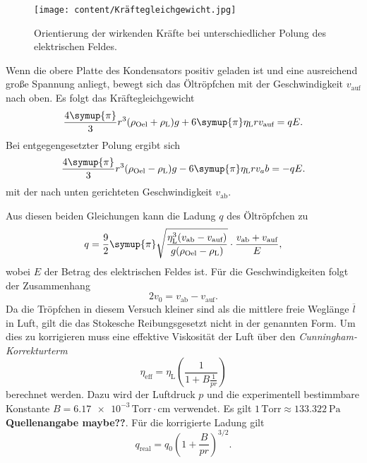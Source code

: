 \begin{figure}
    \centering
    \texttt{[image: content/Kräftegleichgewicht.jpg]}
    \label{fig:Kraeftegleichgewicht}
    \caption{Orientierung der wirkenden Kräfte bei unterschiedlicher Polung des elektrischen Feldes. \cite{v503}}
\end{figure}

Wenn die obere Platte des Kondensators positiv geladen ist und eine ausreichend große Spannung anliegt, bewegt sich das Öltröpfchen mit der Geschwindigkeit $v_\text{auf}$
nach oben. 
Es folgt das Kräftegleichgewicht
\begin{equation*}
    \label{eqn:Kraefte_v_auf}
    \frac{4\symup{\pi}}{3}r^3(\rho_\text{Oel} + \rho_\text{L})g + 6 \symup{\pi} \eta_\text{L}r v_\text{auf} = qE.
\end{equation*}
Bei entgegengesetzter Polung ergibt sich 
\begin{equation*}
    \label{eqn:Kraefte_v_auf}
    \frac{4\symup{\pi}}{3}r^3(\rho_\text{Oel}- \rho_\text{L})g - 6 \symup{\pi} \eta_\text{L}r v_ab = -qE.
\end{equation*}
mit der nach unten gerichteten Geschwindigkeit $v_\text{ab}$.

Aus diesen beiden Gleichungen kann die Ladung $q$ des Öltröpfchen zu 
\begin{equation}
    \label{eqn:q}
    q = \frac{9}{2} \symup{\pi} \sqrt{\frac{\eta_\text{L}^3(v_\text{ab} - v_\text{auf})}{g(\rho_\text{Oel}- \rho_\text{L})}} \cdot \frac{v_\text{ab} + v_\text{auf}}{E},
\end{equation}
wobei $E$ der Betrag des elektrischen Feldes ist. Für die Geschwindigkeiten folgt der Zusammenhang
\begin{equation}
    \label{eqn:v_0}
    2v_0 = v_\text{ab} - v_\text{auf}.
\end{equation}    
Da die Tröpfchen in diesem Versuch kleiner sind als die mittlere freie Weglänge $\overline{l}$ in Luft, gilt die das Stokesche Reibungsgesetzt nicht in der genannten Form.
Um dies zu korrigieren muss eine effektive Viskosität der Luft über den \textit{Cunningham-Korrekturterm}
\begin{equation}
    \label{eqn:n_eff}
    \eta_\text{eff} = \eta_\text{L} \left(\frac{1}{1 + B \frac{1}{pr}}\right)
\end{equation}
berechnet werden. Dazu wird der Luftdruck $p$ und die experimentell bestimmbare Konstante $B =  \num{6.17e-3}\, \text{Torr}\cdot\unit{\centi\metre}$ \cite{v503} verwendet.
Es gilt $1\,\text{Torr} \approx \qty{133.322}{\pascal}$ \textbf{Quellenangabe maybe??}.
Für die korrigierte Ladung gilt
\begin{equation}
    \label{eqn:q_korrigiert}
    q_\text{real} = q_0 \left(1+ \frac{B}{pr}\right)^{3/2}.
\end{equation}
